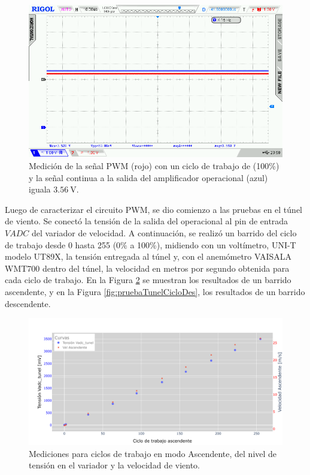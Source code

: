 \begin{figure}[H]
    \centering
    \includegraphics[width=0.9\linewidth]{Figuras/datalogger/Hardware/MedicionesPWM/255.png}
    \caption{Medición de la señal PWM (rojo) con un ciclo de trabajo de (100\%) y la señal continua a la salida del amplificador operacional (azul) iguala $\SI{3.56}{\volt}$.}
    \label{fig:255}
\end{figure}
Luego de caracterizar el circuito PWM, se dio comienzo a las pruebas en el túnel de viento. Se conectó la tensión de la salida del operacional al pin de entrada $VADC$ del variador de velocidad. A continuación, se realizó un barrido del ciclo de trabajo desde 0 hasta 255 (0\% a 100\%), midiendo con un voltímetro, UNI-T modelo UT89X, la tensión entregada al túnel y, con el anemómetro VAISALA WMT700 dentro del túnel, la velocidad en metros por segundo obtenida para cada ciclo de trabajo. En la Figura \ref{fig:pruebaTunelCicloAsc} se muestran los resultados de un barrido ascendente, y en la Figura \ref{fig:pruebaTunelCicloDes}, los resultados de un barrido descendente.

\begin{figure}[H]
    \centering
    \includegraphics[width=1\linewidth]{Figuras/datalogger/Hardware/MedicionesPWM/pruebaTunelCicloAsc.png}
    \caption{Mediciones para ciclos de trabajo en modo Ascendente, del nivel de tensión en el variador y la velocidad de viento.}
    \label{fig:pruebaTunelCicloAsc}
\end{figure}

